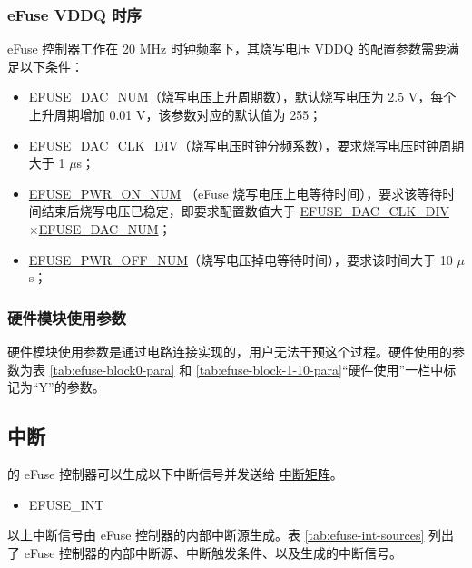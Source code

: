 \documentclass[main\_\_CN.tex]{subfiles}
\begin{document}
\subsubsection{eFuse VDDQ 时序}
\label{sec:efuse-vddq-timing}

eFuse 控制器工作在 20 MHz 时钟频率下，其烧写电压 VDDQ 的配置参数需要满足以下条件：
\begin{itemize}
    \item \hyperref[fielddesc:EFUSEDACNUM]{EFUSE\_DAC\_NUM}（烧写电压上升周期数），默认烧写电压为 2.5 V，每个上升周期增加 0.01 V，该参数对应的默认值为 255；
    \item \hyperref[fielddesc:EFUSEDACCLKDIV]{EFUSE\_DAC\_CLK\_DIV}（烧写电压时钟分频系数），要求烧写电压时钟周期大于 1 $\mu$s；
    \item \hyperref[fielddesc:EFUSEPWRONNUM]{EFUSE\_PWR\_ON\_NUM} （eFuse 烧写电压上电等待时间），要求该等待时间结束后烧写电压已稳定，即要求配置数值大于 \hyperref[fielddesc:EFUSEDACCLKDIV]{EFUSE\_DAC\_CLK\_DIV} ×\hyperref[fielddesc:EFUSEDACNUM]{EFUSE\_DAC\_NUM}；
    \item \hyperref[fielddesc:EFUSEPWROFFNUM]{EFUSE\_PWR\_OFF\_NUM}（烧写电压掉电等待时间），要求该时间大于 10 $\mu$s；
\end{itemize}




\subsubsection{硬件模块使用参数}

硬件模块使用参数是通过电路连接实现的，用户无法干预这个过程。硬件使用的参数为表 \ref{tab:efuse-block0-para} 和 \ref{tab:efuse-block-1-10-para}“硬件使用”一栏中标记为“Y”的参数。



\subsection{中断}


\chipname{} 的 eFuse 控制器可以生成以下中断信号并发送给 \href{mod:intmtrx}{中断矩阵}。

    \begin{itemize}
        \item EFUSE\_INT
    \end{itemize}

以上中断信号由 eFuse 控制器的内部中断源生成。表 \ref{tab:efuse-int-sources} 列出了 eFuse 控制器的内部中断源、中断触发条件、以及生成的中断信号。
\end{document}
